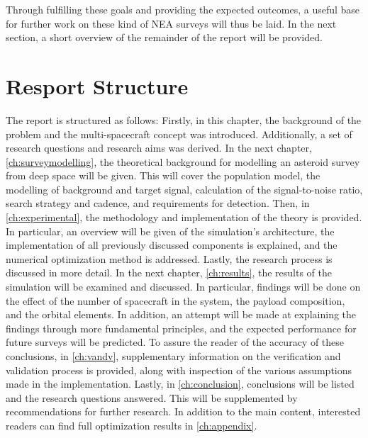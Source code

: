Through fulfilling these goals and providing the expected outcomes, a useful base for further work on these kind of NEA surveys will thus be laid. In the next section, a short overview of the remainder of the report will be provided.

\section{Resport Structure}
The report is structured as follows: Firstly, in this chapter, the background of the problem and the multi-spacecraft concept was introduced. Additionally, a set of research questions and research aims was derived. In the next chapter, \autoref{ch:surveymodelling}, the theoretical background for modelling an asteroid survey from deep space will be given. This will cover the population model, the modelling of background and target signal, calculation of the signal-to-noise ratio, search strategy and cadence, and requirements for detection. Then, in \autoref{ch:experimental}, the methodology and implementation of the theory is provided. In particular, an overview will be given of the simulation's architecture, the implementation of all previously discussed components is explained, and the numerical optimization method is addressed. Lastly, the research process is discussed in more detail. In the next chapter, \autoref{ch:results}, the results of the simulation will be examined and discussed. In particular, findings will be done on the effect of the number of spacecraft in the system, the payload composition, and the orbital elements. In addition, an attempt will be made at explaining the findings through more fundamental principles, and the expected performance for future surveys will be predicted. To assure the reader of the accuracy of these conclusions, in \autoref{ch:vandv}, supplementary information on the verification and validation process is provided, along with inspection of the various assumptions made in the implementation. Lastly, in \autoref{ch:conclusion}, conclusions will be listed and the research questions answered. This will be supplemented by recommendations for further research. In addition to the main content, interested readers can find full optimization results in \autoref{ch:appendix}.
